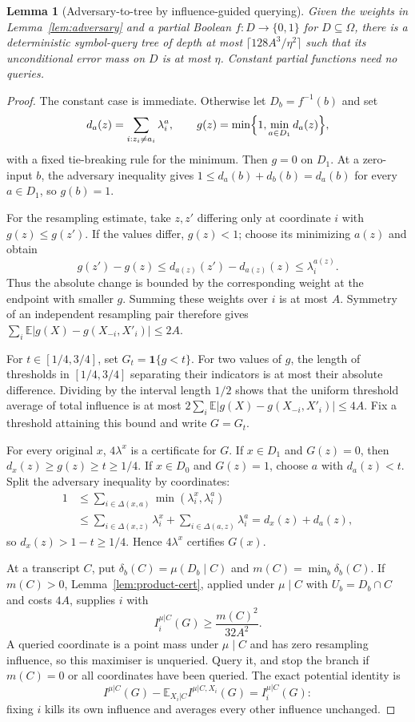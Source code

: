 \documentclass[11pt]{article}
\newtheorem{lemma}[theorem]{Lemma}
\theoremstyle{definition}\newtheorem{definition}[theorem]{Definition}
\theoremstyle{remark}\newtheorem{remark}[theorem]{Remark}
\newcommand{\E}{\mathbb E}\newcommand{\Prb}{\mathbb P}
\begin{document}
\begin{lemma}[Adversary-to-tree by influence-guided querying]\label{lem:adv-tree}
Given the weights in Lemma~\ref{lem:adversary} and a partial Boolean \(f:D\to\{0,1\}\) for \(D\subseteq\Omega\), there is a deterministic symbol-query tree of depth at most \(\lceil128A^3/\eta^2\rceil\) such that its unconditional error mass on \(D\) is at most \(\eta\). Constant partial functions need no queries.
\end{lemma}
\begin{proof}
The constant case is immediate. Otherwise let \(D_b=f^{-1}(b)\) and set
\[
 d_a(z)=\sum_{i:z_i\ne a_i}\lambda^a_i,\qquad
 g(z)=\min\Bigl\{1,\min_{a\in D_1}d_a(z)\Bigr\},
\]
with a fixed tie-breaking rule for the minimum. Then \(g=0\) on \(D_1\). At a zero-input \(b\), the adversary inequality gives \(1\le d_a(b)+d_b(b)=d_a(b)\) for every \(a\in D_1\), so \(g(b)=1\).

For the resampling estimate, take \(z,z'\) differing only at coordinate \(i\) with \(g(z)\le g(z')\). If the values differ, \(g(z)<1\); choose its minimizing \(a(z)\) and obtain
\[
 g(z')-g(z)\le d_{a(z)}(z')-d_{a(z)}(z)\le\lambda^{a(z)}_i.
\]
Thus the absolute change is bounded by the corresponding weight at the endpoint with smaller \(g\). Summing these weights over \(i\) is at most \(A\). Symmetry of an independent resampling pair therefore gives \(\sum_i\E|g(X)-g(X_{-i},X'_i)|\le2A\).

For \(t\in[1/4,3/4]\), set \(G_t=\mathbf 1\{g<t\}\). For two values of \(g\), the length of thresholds in \([1/4,3/4]\) separating their indicators is at most their absolute difference. Dividing by the interval length \(1/2\) shows that the uniform threshold average of total influence is at most \(2\sum_i\E|g(X)-g(X_{-i},X'_i)|\le4A\). Fix a threshold attaining this bound and write \(G=G_t\).

For every original \(x\), \(4\lambda^x\) is a certificate for \(G\). If \(x\in D_1\) and \(G(z)=0\), then \(d_x(z)\ge g(z)\ge t\ge1/4\). If \(x\in D_0\) and \(G(z)=1\), choose \(a\) with \(d_a(z)<t\). Split the adversary inequality by coordinates:
\begin{align*}
 1&\le\sum_{i\in\Delta(x,a)}\min(\lambda^x_i,\lambda^a_i)\\
 &\le\sum_{i\in\Delta(x,z)}\lambda^x_i+\sum_{i\in\Delta(a,z)}\lambda^a_i=d_x(z)+d_a(z),
\end{align*}
so \(d_x(z)>1-t\ge1/4\). Hence \(4\lambda^x\) certifies \(G(x)\).

At a transcript \(C\), put \(\delta_b(C)=\mu(D_b\mid C)\) and \(m(C)=\min_b\delta_b(C)\). If \(m(C)>0\), Lemma~\ref{lem:product-cert}, applied under \(\mu\mid C\) with \(U_b=D_b\cap C\) and costs \(4A\), supplies \(i\) with
\[
 I^{\mu|C}_i(G)\ge\frac{m(C)^2}{32A^2}.
\]
A queried coordinate is a point mass under \(\mu\mid C\) and has zero resampling influence, so this maximiser is unqueried. Query it, and stop the branch if \(m(C)=0\) or all coordinates have been queried. The exact potential identity is
\[
 I^{\mu|C}(G)-\E_{X_i|C}I^{\mu|C,X_i}(G)=I^{\mu|C}_i(G):
\]
fixing \(i\) kills its own influence and averages every other influence unchanged.


\end{proof}
\end{document}
